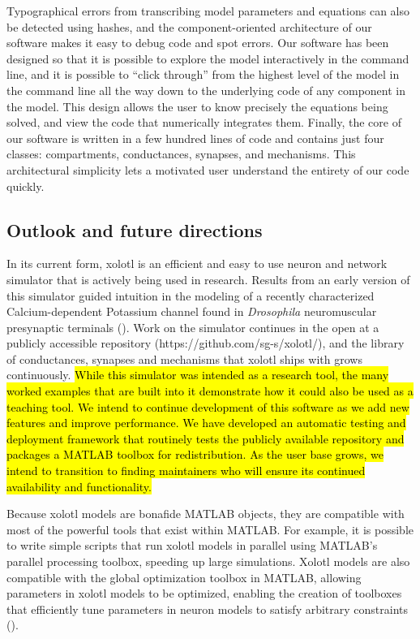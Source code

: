 \documentclass{frontiersSCNS} %
\begin{document}
Typographical errors from transcribing model parameters and equations can also be detected using hashes, and the component-oriented architecture of our software makes it easy to debug code and spot errors. Our software has been designed so that it is possible to explore the model interactively in the command line, and it is possible to ``click through'' from the highest level of the model in the command line all the way down to the underlying code of any component in the model. This design allows the user to know precisely the equations being solved, and view the code that numerically integrates them. Finally, the core of our software is written in a few hundred lines of code and contains just four classes: compartments, conductances, synapses, and mechanisms. This architectural simplicity lets a motivated user understand the entirety of our code quickly.


\subsection{Outlook and future directions}

In its current form, xolotl is an efficient and easy to use neuron and network simulator that is actively being used in research.
Results from an early version of this simulator guided intuition in the modeling of a recently characterized Calcium-dependent Potassium channel found in {\em Drosophila} neuromuscular presynaptic terminals (\cite{bronk2018regulation}). Work on the simulator continues in the open at a publicly accessible repository (https://github.com/sg-s/xolotl/), and the library of conductances, synapses and mechanisms that xolotl ships with grows continuously. \hl{While this simulator was intended as a research tool, the many worked examples that are built into it demonstrate how it could also be used as a teaching tool. We intend to continue development of this software as we add new features and improve performance. We have developed an automatic testing and deployment framework that routinely tests the publicly available repository and packages a MATLAB toolbox for redistribution. As the user base grows, we intend to transition to finding maintainers who will ensure its continued availability and functionality. }

Because xolotl models are bonafide MATLAB objects, they are compatible with most of the powerful tools that exist within MATLAB. For example, it is possible to write simple scripts that run xolotl models in parallel using MATLAB's parallel processing toolbox, speeding up large simulations. Xolotl models are also compatible with the global optimization toolbox in MATLAB, allowing parameters in xolotl models to be optimized, enabling the creation of toolboxes that efficiently tune parameters in neuron models to satisfy arbitrary constraints (\cite{Achard:2006ia, Krichmar:2014jj, Keren:2005ja, VanGeit:2007ea, Druckmann:2008kg}).
\end{document}
